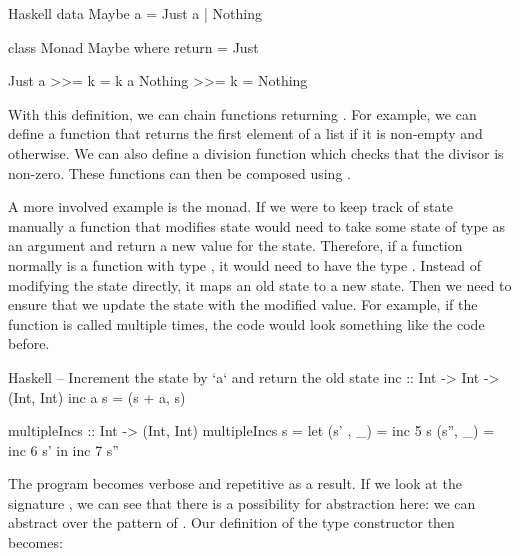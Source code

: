 \begin{lst}{Haskell}
data Maybe a
  = Just a
  | Nothing

class Monad Maybe where
  return = Just
  
  Just a  >>= k = k a
  Nothing >>= k = Nothing
\end{lst}

With this definition, we can chain functions returning . For example, we can define a  function that returns the first element of a list if it is non-empty and  otherwise. We can also define a division function which checks that the divisor is non-zero. These functions can then be composed using \hs{>>=}.


A more involved example is the  monad. If we were to keep track of state manually a function that modifies state would need to take some state of type  as an argument and return a new value for the state. Therefore, if a function  normally is a function with type , it would need to have the type . Instead of modifying the state directly, it maps an old state to a new state. Then we need to ensure that we update the state with the modified value. For example, if the function is called multiple times, the code would look something like the code before.

\begin{lst}{Haskell}
-- Increment the state by `a` and return the old state
inc :: Int -> Int -> (Int, Int)
inc a s = (s + a, s)

multipleIncs :: Int -> (Int, Int)
multipleIncs s = let
  (s' , _) = inc 5 s
  (s'', _) = inc 6 s'
  in inc 7 s''
\end{lst}

The program becomes verbose and repetitive as a result. If we look at the signature , we can see that there is a possibility for abstraction here: we can abstract over the pattern of . Our definition of the  type constructor then becomes:

